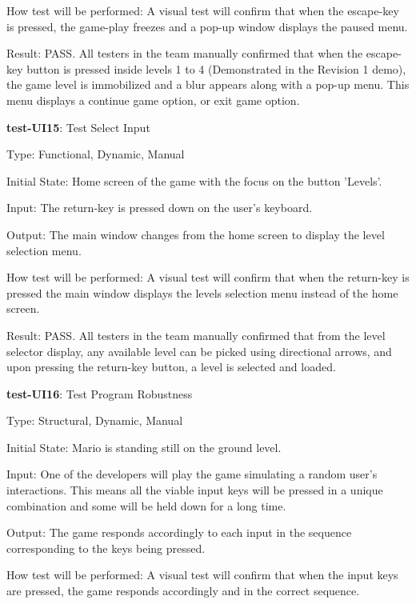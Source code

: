 \documentclass[12pt, titlepage]{article}
\begin{document}
\begin{enumerate}
{How test will be performed: A visual test will confirm that when the escape-key is pressed, the game-play freezes and a pop-up window displays the paused menu.

Result: PASS. All testers in the team manually confirmed that when the escape-key button is pressed inside levels 1 to 4 (Demonstrated in the Revision 1 demo), the game level is immobilized and a blur appears along with a pop-up menu. This menu displays a continue game option, or exit game option.

\item{\textbf{test-UI15}: Test Select Input\\}

Type: Functional, Dynamic, Manual
					
Initial State: Home screen of the game with the focus on the button 'Levels'.
					
Input: The return-key is pressed down on the user's keyboard.
					
Output: The main window changes from the home screen to display the level selection menu.
					
How test will be performed: A visual test will confirm that when the return-key is pressed the main window displays the levels selection menu instead of the home screen.

Result: PASS. All testers in the team manually confirmed that from the level selector display, any available level can be picked using directional arrows, and upon pressing the return-key button, a level is selected and loaded.

\item{\textbf{test-UI16}: Test Program Robustness\\}

Type: Structural, Dynamic, Manual
					
Initial State: Mario is standing still on the ground level.
					
Input: One of the developers will play the game simulating a random user's interactions. This means all the viable input keys will be pressed in a unique combination and some will be held down for a long time.
					
Output: The game responds accordingly to each input in the sequence corresponding to the keys being pressed. 
					
How test will be performed: A visual test will confirm that when the input keys are pressed, the game responds accordingly and in the correct sequence.

}
\end{enumerate}
\end{document}
